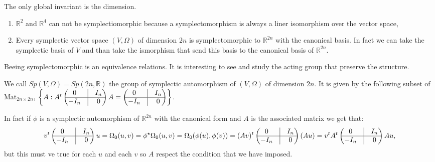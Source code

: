 \begin{Prp}
    The only global invariant is the dimension.
\end{Prp}

\begin{Exp}\leavevmode
    \begin{enumerate}[label=\ExpLbl]
        \item $\mathbb{R}^2$ and $\mathbb{R}^4$ can not be symplectiomorphic because a symplectomorphism is always a liner isomorphism over the vector space,

        \item Every symplectic vector space $(V,\Omega)$ of dimension $2n$ is symplectomorphic to $\mathbb{R}^{2n}$ with the canonical basis. In fact we can take the symplectic basis of $V$ and than take the ismorphism that send this basis to the canonical basis of $\mathbb{R}^{2n}$.
    \end{enumerate}
\end{Exp}

\begin{Rmk}
    Beeing symplectomorphic is an equivalence relations. It is interesting to see and study the acting group that preserve the structure.
\end{Rmk}

\begin{Dfn}
    We call $Sp(V,\Omega)=Sp(2n,\mathbb{R})$ the group of symplectic automorphism of $(V,\Omega)$ of dimension $2n$. It is given by the following subset of $\text{Mat}_{2n \times 2n}$, $\left\{ A : A^t \begin{pmatrix} 0 &\vline &I_n \\ \hline -I_n &\vline &0\end{pmatrix} A= \begin{pmatrix} 0 &\vline &I_n \\ \hline -I_n &\vline &0\end{pmatrix} \right\} $.

    In fact if $\phi$ is a symplectic automorphism of $\mathbb{R}^{2n}$ with the canonical form and $A$ is the associated matrix we get that:
    \[
        v^t \begin{pmatrix} 0 &\vline &I_n \\ \hline -I_n &\vline &0\end{pmatrix} u=\Omega_0(u,v)=\phi^\star\Omega_0(u,v)=\Omega_0(\phi(u),\phi(v))=(Av)^t \begin{pmatrix} 0 &\vline &I_n \\ \hline -I_n &\vline &0\end{pmatrix} (Au)=v^t A^t \begin{pmatrix} 0 &\vline &I_n \\ \hline -I_n &\vline &0\end{pmatrix} A u,
    \]
    but this must ve true for each $u$ and each $v$ so $A$ respect the condition that we have imposed.
\end{Dfn}

